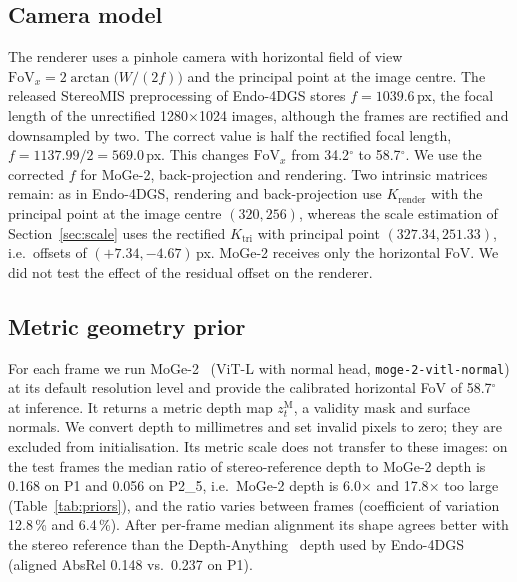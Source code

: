 \documentclass[conference]{IEEEtran}
\begin{document}
\subsection{Camera model}
\label{sec:intrinsics}
The renderer uses a pinhole camera with horizontal field of view $\mathrm{FoV}_x=2\arctan\!\big(W/(2f)\big)$ and the principal point at the image centre. The released StereoMIS preprocessing of Endo-4DGS stores $f{=}1039.6$\,px, the focal length of the unrectified 1280$\times$1024 images, although the frames are rectified and downsampled by two. The correct value is half the rectified focal length, $f{=}1137.99/2{=}569.0$\,px. This changes $\mathrm{FoV}_x$ from 34.2$^\circ$ to 58.7$^\circ$. We use the corrected $f$ for MoGe-2, back-projection and rendering. Two intrinsic matrices remain: as in Endo-4DGS, rendering and back-projection use $K_{\mathrm{render}}$ with the principal point at the image centre $(320, 256)$, whereas the scale estimation of Section~\ref{sec:scale} uses the rectified $K_{\mathrm{tri}}$ with principal point $(327.34, 251.33)$, i.e.\ offsets of $(+7.34,-4.67)$\,px. MoGe-2 receives only the horizontal FoV. We did not test the effect of the residual offset on the renderer.

\subsection{Metric geometry prior}
\label{sec:prior}
For each frame we run MoGe-2~\cite{wang2025moge2} (ViT-L with normal head, \texttt{moge-2-vitl-normal}) at its default resolution level and provide the calibrated horizontal FoV of 58.7$^\circ$ at inference. It returns a metric depth map $z^{\mathrm{M}}_t$, a validity mask and surface normals. We convert depth to millimetres and set invalid pixels to zero; they are excluded from initialisation. Its metric scale does not transfer to these images: on the test frames the median ratio of stereo-reference depth to MoGe-2 depth is 0.168 on P1 and 0.056 on P2\_5, i.e.\ MoGe-2 depth is 6.0$\times$ and 17.8$\times$ too large (Table~\ref{tab:priors}), and the ratio varies between frames (coefficient of variation 12.8\,\% and 6.4\,\%). After per-frame median alignment its shape agrees better with the stereo reference than the Depth-Anything~\cite{yang2024depthanything} depth used by Endo-4DGS (aligned AbsRel 0.148 vs.\ 0.237 on P1).
\end{document}
